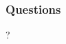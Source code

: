 \documentclass[9pt]{beamer}
\begin{document}
\begin{frame}
  \frametitle{Questions}
  \centering 
  \Huge ?
\end{frame}

\end{document}
